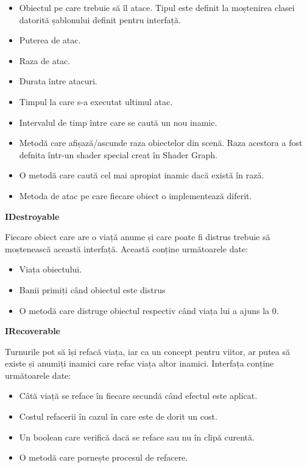 \documentclass[12pt, a4paper]{article}
\begin{document}
	\begin{itemize}
		\item Obiectul pe care trebuie să îl atace. Tipul este definit la moștenirea clasei datorită șablonului definit pentru interfață.
		\item Puterea de atac.
		\item Raza de atac.
		\item Durata între atacuri.
		\item Timpul la care s-a executat ultimul atac.
		\item Intervalul de timp între care se caută un nou inamic.
		\item Metodă care afișază/ascunde raza obiectelor din scenă. Raza acestora a fost defnita într-un shader special creat în Shader Graph.
		\item O metodă care caută cel mai apropiat inamic dacă există în rază.
		\item Metoda de atac pe care fiecare obiect o implementează diferit.
	\end{itemize}
	\bigskip
	
	\textbf{IDestroyable}
	
	Fiecare obiect care are o viață anume și care poate fi distrus trebuie să moștenească această interfață. Această conține următoarele date:
	
	\begin{itemize}
		\item Viața obiectului.
		\item Banii primiți când obiectul este distrus
		\item O metodă care distruge obiectul respectiv când viața lui a ajuns la 0.
	\end{itemize}
	\bigskip
	
	\textbf{IRecoverable}
	
	Turnurile pot să își refacă viața, iar ca un concept pentru viitor, ar putea să existe și anumiți inamici care refac viața altor inamici. Interfața conține următoarele date:
	
	\begin{itemize}
		\item Câtă viață se reface în fiecare secundă când efectul este aplicat.
		\item Costul refacerii în cazul în care este de dorit un cost.
		\item Un boolean care verifică dacă se reface sau nu în clipă curentă.
		\item O metodă care pornește procesul de refacere.
	\end{itemize}
	
\end{document}
